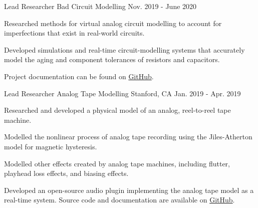 \begin{cventries}
  \cventry
    {Lead Researcher} %
    {Bad Circuit Modelling} %
    {} %
    {Nov. 2019 - June 2020} %
    {
        \begin{cvitems}
              \item{Researched methods for virtual analog circuit modelling
                    to account for imperfections that exist in real-world circuits.}
              \item{Developed simulations and real-time circuit-modelling systems that
                    accurately model the aging and component tolerances of resistors and capacitors.}
              \item{Project documentation can be found on \href{https://github.com/jatinchowdhury18/Bad-Circuit-Modelling}{GitHub}.}
        \end{cvitems}
    }

  \cventry
    {Lead Researcher} %
    {Analog Tape Modelling} %
    {Stanford, CA} %
    {Jan. 2019 - Apr. 2019} %
    {
        \begin{cvitems}
              \item{Researched and developed a physical model of an analog, reel-to-reel tape machine.}
              \item{Modelled the nonlinear process of analog tape recording using the Jiles-Atherton model for magnetic hysteresis.}
              \item{Modelled other effects created by analog tape machines, including flutter, playhead loss effects, and biasing effects.}
              \item{Developed an open-source audio plugin implementing the analog tape model as a real-time system.
                    Source code and documentation are available on \href{https://github.com/jatinchowdhury18/AnalogTapeModel}{GitHub}.}
        \end{cvitems}
    }



\end{cventries}

